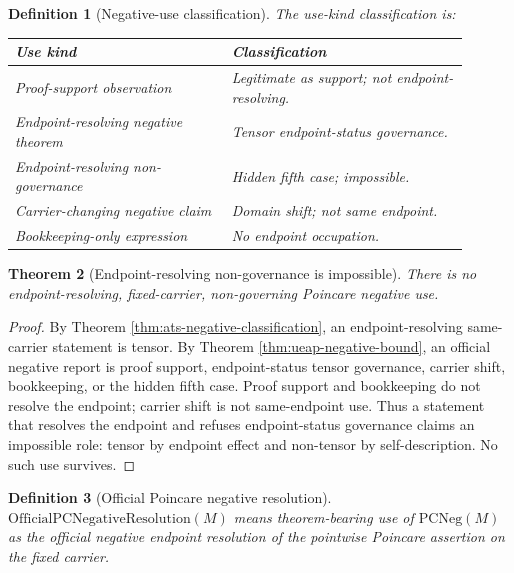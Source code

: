 \documentclass[11pt]{article}
\newtheorem{theorem}{Theorem}[section]
\newtheorem{definition}[theorem]{Definition}
\newcommand{\OfficialPCNegativeResolution}{\mathrm{OfficialPCNegativeResolution}}
\newcommand{\PCNeg}{\mathrm{PCNeg}}
\begin{document}
\begin{definition}[Negative-use classification]
The use-kind classification is:
\begin{longtable}{L{0.43\linewidth}L{0.47\linewidth}}
\toprule
\textbf{Use kind} & \textbf{Classification}\\
\midrule
Proof-support observation & Legitimate as support; not endpoint-resolving.\\
Endpoint-resolving negative theorem & Tensor endpoint-status governance.\\
Endpoint-resolving non-governance & Hidden fifth case; impossible.\\
Carrier-changing negative claim & Domain shift; not same endpoint.\\
Bookkeeping-only expression & No endpoint occupation.\\
\bottomrule
\end{longtable}
\end{definition}

\begin{theorem}[Endpoint-resolving non-governance is impossible]\label{thm:no-hidden-fifth}
There is no endpoint-resolving, fixed-carrier, non-governing Poincare negative use.
\end{theorem}
\begin{proof}
By Theorem \ref{thm:ats-negative-classification}, an endpoint-resolving same-carrier statement is tensor. By Theorem \ref{thm:ueap-negative-bound}, an official negative report is proof support, endpoint-status tensor governance, carrier shift, bookkeeping, or the hidden fifth case. Proof support and bookkeeping do not resolve the endpoint; carrier shift is not same-endpoint use. Thus a statement that resolves the endpoint and refuses endpoint-status governance claims an impossible role: tensor by endpoint effect and non-tensor by self-description. No such use survives.
\end{proof}

\begin{definition}[Official Poincare negative resolution]
\(\OfficialPCNegativeResolution(M)\) means theorem-bearing use of \(\PCNeg(M)\) as the official negative endpoint resolution of the pointwise Poincare assertion on the fixed carrier.
\end{definition}
\end{document}
